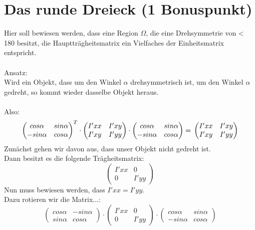 \documentclass{ezb}
\begin{document}
\section{Das runde Dreieck (1 Bonuspunkt)}
Hier soll bewiesen werden, dass eine Region $\Omega$, die eine Drehsymmetrie von < 180 \degree besitzt, die Hauptträgheitsmatrix ein Vielfaches der Einheitsmatrix entspricht.\\
\\
Ansatz: \\
Wird ein Objekt, dass um den Winkel $\alpha$ drehsymmetrisch ist, um den Winkel $\alpha$ gedreht, so kommt wieder dasselbe Objekt heraus.\\
\\
Also:\\
\begin{equation}
\begin{pmatrix}
cos \alpha & sin \alpha \\
-sin \alpha & cos \alpha 
\end{pmatrix}^{T}
\cdot
\begin{pmatrix}
I'xx & I'xy \\
I'xy & I'yy 
\end{pmatrix}
\cdot
\begin{pmatrix}
cos \alpha & sin \alpha \\
-sin \alpha & cos \alpha 
\end{pmatrix}
= \\
\begin{pmatrix}
I'xx & I'xy \\
I'xy & I'yy 
\end{pmatrix}
\label{urformel}
\end{equation}
\linebreak
Zunächst gehen wir davon aus, dass unser Objekt nicht gedreht ist.\\
Dann besitzt es die folgende Trägheitsmatrix:\\
\begin{equation}
\begin{pmatrix}
I'xx & 0 \\
0 & I'yy
\end{pmatrix}
\end{equation}
\linebreak
Nun muss bewiesen werden, dass $I'xx = I'yy$.\\
Dazu rotieren wir die Matrix...:\\
\begin{equation}
\begin{pmatrix}
cos \alpha & -sin \alpha \\
sin \alpha & cos \alpha 
\end{pmatrix}
\cdot
\begin{pmatrix}
I'xx & 0 \\
0 & I'yy 
\end{pmatrix}
\cdot
\begin{pmatrix}
cos \alpha & sin \alpha \\
-sin \alpha & cos \alpha 
\end{pmatrix}
\label{drehformel}
\end{equation}
\end{document}
